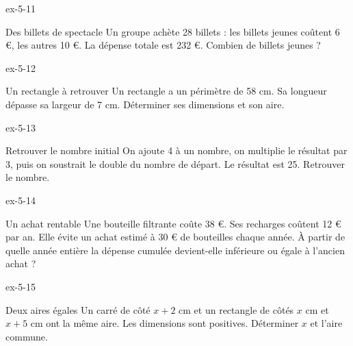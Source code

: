 \clearpage{}
\begin{blocLivre}{ex-5-11}\begin{exercice}[3]{Des billets de spectacle}
Un groupe achète 28 billets : les billets jeunes coûtent 6 €, les autres 10 €. La dépense totale est 232 €. Combien de billets jeunes ?
\end{exercice}\end{blocLivre}
\begin{blocLivre}{ex-5-12}\begin{exercice}[3]{Un rectangle à retrouver}
Un rectangle a un périmètre de 58 cm. Sa longueur dépasse sa largeur de 7 cm. Déterminer ses dimensions et son aire.
\label{fig-ex-5-12}
\end{exercice}\end{blocLivre}
\begin{blocLivre}{ex-5-13}\begin{exercice}[3]{Retrouver le nombre initial}
On ajoute 4 à un nombre, on multiplie le résultat par 3, puis on soustrait le double du nombre de départ. Le résultat est 25. Retrouver le nombre.
\end{exercice}\end{blocLivre}
\begin{blocLivre}{ex-5-14}\begin{exercice}[3]{Un achat rentable}
Une bouteille filtrante coûte 38 €. Ses recharges coûtent 12 € par an. Elle évite un achat estimé à 30 € de bouteilles chaque année. À partir de quelle année entière la dépense cumulée devient-elle inférieure ou égale à l’ancien achat ?
\end{exercice}\end{blocLivre}
\begin{blocLivre}{ex-5-15}\begin{exercice}[3]{Deux aires égales}
Un carré de côté $x+2$ cm et un rectangle de côtés $x$ cm et $x+5$ cm ont la même aire. Les dimensions sont positives. Déterminer $x$ et l’aire commune.
\label{fig-ex-5-15}
\end{exercice}\end{blocLivre}

\clearpage
